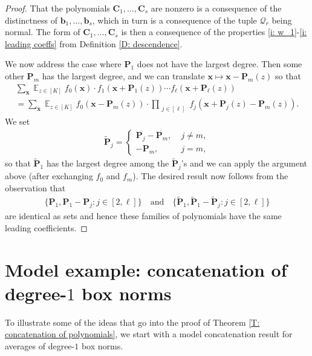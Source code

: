 \documentclass[11pt]{amsart}
\theoremstyle{definition}
\DeclareMathOperator*{\E}{\mathbb{E}}
\newcommand{\CQ}{{\mathcal Q}}
\renewcommand{\b}{{\mathbf{b}}}
\newcommand{\bc}{{\mathbf{C}}}
\newcommand{\p}{{\mathbf{P}}}
\newcommand{\bx}{{\mathbf{x}}}
\begin{document}
\begin{proof}
    That the polynomials $\bc_1, \ldots, \bc_s$ are nonzero is a consequence of the distinctness of $\b_{1}, \ldots, \b_{s}$, which in turn is a consequence of the tuple $\CQ_r$ being normal. The form of $\bc_1, \ldots, \bc_s$ is then a consequence of the properties \eqref{i: w_1}-\eqref{i: leading coeffs} from Definition \ref{D: descendence}.


    
    We now address the case where $\p_1$ does not have the largest degree.  Then some other $\p_m$ has the largest degree, and we can translate $\bx\mapsto \bx-\p_m(z)$ so that
    \begin{multline*}
        \sum_{\bx}\E_{z\in[K]}
        f_0(\bx)\cdot f_1(\bx+\p_1(z))\cdots f_\ell(\bx+\p_\ell(z))\\
        = \sum_{\bx}\E_{z\in[K]} 
        f_0(\bx-\p_m(z))\cdot \prod_{\substack{j\in[\ell]}} f_j(\bx+\p_j(z)-\p_m(z)).
    \end{multline*}
    We set
    \begin{align*}
        \tilde{\p}_j = \begin{cases} \p_j - \p_m,\; &j\neq m,\\
        -\p_m,\; & j = m,
        \end{cases}
    \end{align*}
   so that $\tilde{\p}_1$ has the largest degree among the $\tilde{\p}_j$'s and we can apply the argument above (after exchanging $f_0$ and $f_m$).  The desired result now follows from the observation that
    \begin{align}\label{E: collections of polys}
        \{\p_1, \p_1-\p_j: j\in[2,\ell]\} \quad\textrm{and}\quad \{\tilde{\p}_1, \tilde{\p}_1-\tilde{\p}_j: j\in[2,\ell]\}
    \end{align}
    are identical as sets and hence these families of polynomials have the same leading coefficients. 
  \end{proof}


\section{Model example: concatenation of degree-$1$ box norms}\label{S: model}

To illustrate some of the ideas that go into the proof of Theorem \ref{T: concatenation of polynomials}, we start with a model concatenation result for averages of degree-$1$ box norms.
\end{document}
